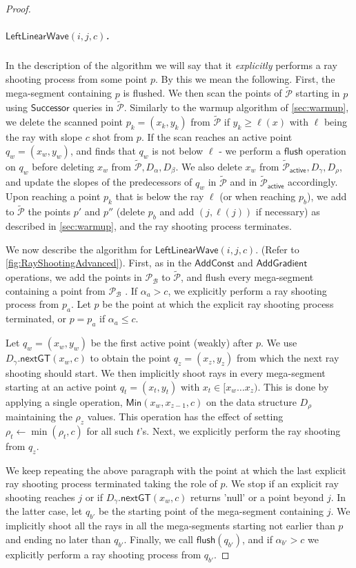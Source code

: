\documentclass[10pt,a4paper]{article}
\newcommand{\AC}{\mathsf{AddConst}}
\newcommand{\AG}{\mathsf{AddGradient}}
\newcommand{\LLW}{\mathsf{LeftLinearWave}}
\newcommand{\assign}{\leftarrow}
\newcommand{\local}{\text{short }}
\newcommand{\longrange}{\text{long }}
\newcommand{\addmin}{\text{Add-min }}
\newcommand{\Successor}{\mathsf{Successor}}
\newcommand{\Min}{\mathsf{Min}}
\newcommand{\nextGT}{\mathsf{nextGT}}
\renewcommand{\P}{\mathcal{P}}
\newcommand{\TAP}{\tilde{\P}_{\mathsf{active}}}
\newcommand{\DAL}{D_{\alpha}}
\newcommand{\DGAM}{D_{\gamma}}
\newcommand{\TP}{\tilde{\P}}
\newcommand{\para}[1]{\vspace{-0.1in} \subparagraph*{#1}}
\newcommand{\B}{\mathcal{B}}
\newcommand{\rl}[1]{\rho_{#1}}
\newcommand{\flush}{\mathsf{flush}}
\begin{document}
\begin{proof}
\para{$\LLW(i,j,c)$.}
In the description of the algorithm we will say that it \textit{explicitly} performs a ray shooting process from some point $p$. 
By this we mean the following.
First, the mega-segment containing $p$ is flushed.
We then scan the points of $\TP$ starting in $p$ using $\Successor$ queries in $\TP$.
Similarly to the warmup algorithm of \cref{sec:warmup}, we delete the scanned point $p_k=(x_k,y_k)$ from $\TP$ if $y_k \ge \ell(x)$ with $\ell$ being the ray with slope $c$ shot from $p$.
If the scan reaches an active point $q_w = (x_w,y_w)$, and finds that $q_w$ is not below $\ell$ - we perform a $\flush$ operation on $q_w$ before deleting $x_w$ from $\TP, \DAL, D_\beta$.
We also delete $x_w$ from $\TAP, \DGAM, D_\rho$, and update the slopes of the predecessors of $q_w$ in $\TP$ and in $\TAP$ accordingly.
Upon reaching a point $p_k$ that is below the ray $\ell$ (or when reaching $p_b$), we add to $\TP$ the points $p'$ and $p''$ (delete $p_b$ and add $(j,\ell(j))$ if necessary) as described in \cref{sec:warmup}, and the ray shooting process terminates.

We now describe the algorithm for $\LLW(i,j,c)$. (Refer to  \cref{fig:RayShootingAdvanced}).
First, as in the $\AC$ and $\AG$ operations,  we add the points in $\P_{\B}$ to $\TP$, and flush every mega-segment containing a point from $\P_{\B}$ .
If $\alpha_a > c$, we explicitly perform a ray shooting process from $p_a$.
Let $p$ be the point at which the explicit ray shooting process terminated, or $p=p_a$ if $\alpha_a \le c$.

Let $q_{w}=(x_w,y_w)$ be the first active point (weakly) after $p$. 
We use $\DGAM.\nextGT(x_w,c)$ to obtain the  point $q_z = (x_z,y_z)$ from which the next \longrange ray shooting should start.
We then implicitly shoot \local rays in 
every mega-segment starting at an active point $q_t=(x_t,y_t)$ with $x_t\in [x_w \ldots x_z)$. This is done by applying a single  operation, $\Min(x_w,x_{z-1},c)$ on the \addmin data structure $D_\rho$ maintaining the $\rl{z}$ values.
This operation has the effect of setting  $\rl{t} \assign \min(\rl{t},c)$ for all such $t$'s. Next, we explicitly perform the \longrange  ray shooting from $q_z$.

 We keep repeating the above paragraph with the point at which the last explicit \longrange ray shooting process terminated taking the role of $p$.
We stop if an explicit ray shooting reaches $j$ or if $\DGAM.\nextGT(x_w,c)$ returns 'null' or a point beyond $j$. In the latter case, let $q_{b'}$ be the starting point of the mega-segment containing $j$. We  implicitly shoot all the \local rays in all the mega-segments starting not earlier than $p$ and ending no later than $q_{b'}$. Finally, we call $\flush(q_{b'})$, and if $\alpha_{b'} > c$ we explicitly perform a ray shooting process from $q_{b'}$.


\end{proof}
\end{document}
